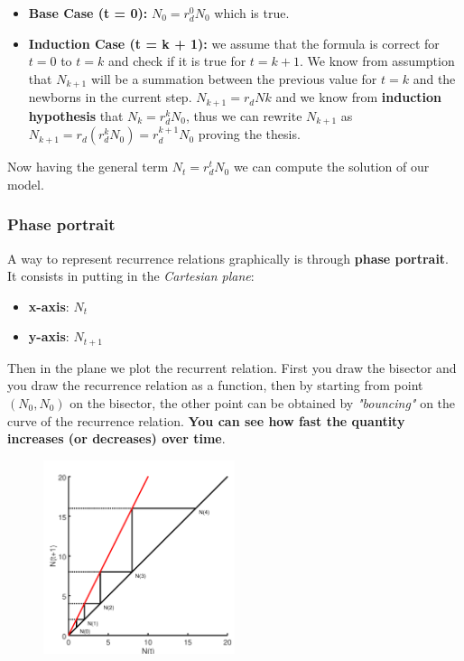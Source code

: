 \begin{itemize}[label={}]
    
    \item \textbf{Base Case (t = 0):} $N_{0} = r^{0}_{d}N_{0}$ which is true.
    
    \item \textbf{Induction Case (t = k + 1):} we assume that the formula is correct for $t = 0$ to $t = k$ and check if it is true for $t = k + 1$. We know from assumption that $N_{k+1}$ will be a summation between the previous value for $t = k$ and the newborns in the current step. $N_{k+1} = r_{d}N{k}$ and we know from \textbf{induction hypothesis} that $N_{k} = r^{k}_{d}N_{0}$, thus we can rewrite $N_{k+1}$ as $N_{k+1} = r_{d}(r^{k}_{d}N_{0}) = r^{k+1}_{d}N_{0}$ proving the thesis.  
    
\end{itemize}

Now having the general term $N_{t} = r^{t}_{d}N_{0}$ we can compute the solution of our model.

\subsubsection{Phase portrait}
A way to represent recurrence relations graphically is through \textbf{phase portrait}. It consists in putting in the \textit{Cartesian plane}:
\begin{itemize}
    \item \textbf{x-axis}: $N_{t}$

    \item \textbf{y-axis}: $N_{t+1}$
\end{itemize}

Then in the plane we plot the recurrent relation. First you draw the bisector and you draw the recurrence relation as a function, then by starting from point $(N_{0}, N_{0})$ on the bisector, the other point can be obtained by \textit{"bouncing"} on the curve of the recurrence relation. \textbf{You can see how fast the quantity increases (or decreases) over time}.

\begin{figure}[h]
    \centering
    \includegraphics[width=0.5\textwidth]{Images/02-Discrete Dynamical Systems/phase_potrait.png}
    \caption{} 
\end{figure}

